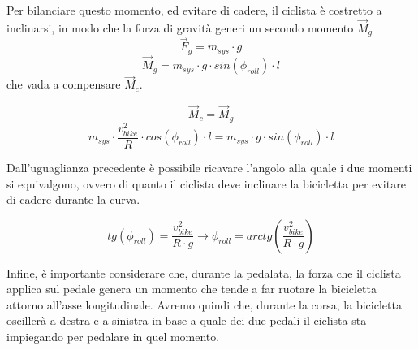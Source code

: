 \documentclass[class=article]{standalone}
\begin{document}
	Per bilanciare questo momento, ed evitare di cadere, il ciclista è costretto a inclinarsi, in modo che la forza di gravità generi un secondo momento \(\vec{M}_{g}\)
		\[\vec{F}_{g}=m_{sys}\cdot g\]
	\[\vec{M}_{g}=m_{sys}\cdot g \cdot sin(\phi_{roll})\cdot l\]
	che vada a compensare \(\vec{M}_{c}\).	

	\[\vec{M}_{c}=\vec{M}_{g}\]
	\[m_{sys}\cdot\frac{v_{bike}^2}{R}\cdot cos(\phi_{roll})\cdot l=m_{sys}\cdot g \cdot sin(\phi_{roll})\cdot l\]
	
	Dall'uguaglianza precedente è possibile ricavare l'angolo alla quale i due momenti si equivalgono, ovvero di quanto il ciclista deve inclinare la bicicletta per evitare di cadere durante la curva.
	
	\[tg(\phi_{roll})=\frac{v_{bike}^2}{R\cdot g} \rightarrow \phi_{roll}=arctg\left(\frac{v_{bike}^2}{R\cdot g}\right)\]
	
	Infine, è importante considerare che, durante la pedalata, la forza che il ciclista applica sul pedale genera un momento che tende a far ruotare la bicicletta attorno all'asse longitudinale. Avremo quindi che, durante la corsa, la bicicletta oscillerà a destra e a sinistra in base a quale dei due pedali il ciclista sta impiegando per pedalare in quel momento.
	
	
	
\end{document}
